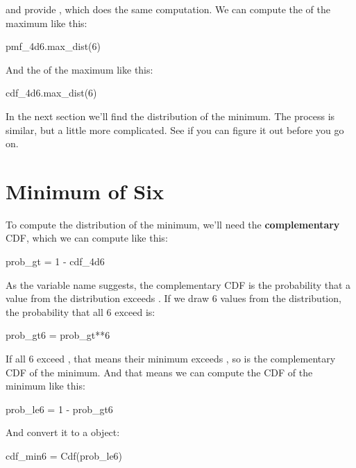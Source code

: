 \documentclass[12pt]{book}
\theoremstyle{exercise}
\begin{document}
 and  provide , which does the same computation.
We can compute the  of the maximum like this:

\begin{code}
pmf_4d6.max_dist(6)
\end{code}

And the  of the maximum like this:

\begin{code}
cdf_4d6.max_dist(6)
\end{code}

In the next section we'll find the distribution of the minimum.
The process is similar, but a little more complicated.
See if you can figure it out before you go on.




%
%

\section{Minimum of Six}

To compute the distribution of the minimum, we'll need the {\bf complementary} CDF, which we can compute like this:

\begin{code}
prob_gt = 1 - cdf_4d6
\end{code}

As the variable name suggests, the complementary CDF is the probability that a value from the distribution exceeds .
If we draw 6 values from the distribution, the probability that all 6 exceed  is:

\begin{code}
prob_gt6 = prob_gt**6
\end{code}

If all 6 exceed , that means their minimum exceeds , so  is the complementary CDF of the minimum.
And that means we can compute the CDF of the minimum like this:

\begin{code}
prob_le6 = 1 - prob_gt6
\end{code}

And convert it to a  object:

\begin{code}
cdf_min6 = Cdf(prob_le6)
\end{code}
\end{document}
